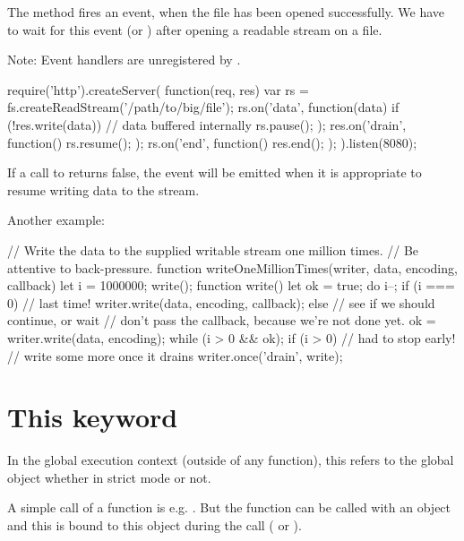 The method  fires an  event, when the
file has been opened successfully. We have to wait for this event (or
) after opening a readable stream on a file.

Note: Event handlers are unregistered by .

\begin{js}
  require('http').createServer( function(req, res) {
    var rs = fs.createReadStream('/path/to/big/file');
    rs.on('data', function(data) {
      if (!res.write(data)) { // data buffered internally
        rs.pause();}
    });
    res.on('drain', function() {
      rs.resume();
    });
    rs.on('end', function() {
      res.end();
    });
  }).listen(8080);
\end{js}

If a call to  returns false, the  event will be
emitted when it is appropriate to resume writing data to the stream.


Another example:
\begin{js}
  // Write the data to the supplied writable stream one million times.
  // Be attentive to back-pressure.
  function writeOneMillionTimes(writer, data, encoding, callback) {
    let i = 1000000;
    write();
    function write() {
      let ok = true;
      do {
        i--;
        if (i === 0) {
          // last time!
          writer.write(data, encoding, callback);
        } else {
          // see if we should continue, or wait
          // don't pass the callback, because we're not done yet.
          ok = writer.write(data, encoding);
        }
      } while (i > 0 && ok);
      if (i > 0) {
        // had to stop early!
        // write some more once it drains
        writer.once('drain', write);
      }
    }
  }
\end{js}












\section{This keyword}


In the global execution context (outside of any function), this refers to the
global object whether in strict mode or not.

A simple call of a function is e.g. . But the function can
be called with an object and this is bound to this object during the call
( or ).



